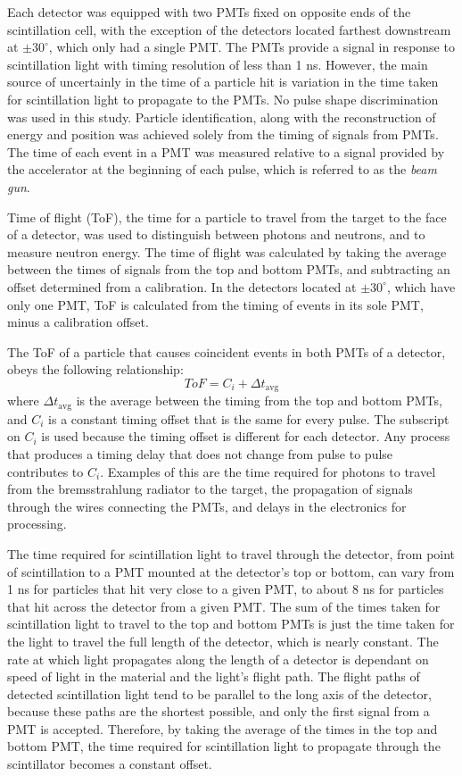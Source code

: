 Each detector was equipped with two PMTs fixed on opposite ends of the scintillation cell, with the exception of the detectors located farthest downstream at $\pm30^{\circ}$, which only had a single PMT. The PMTs provide a signal in response to scintillation light with timing resolution of less than 1 ns. However, the main source of uncertainly in the time of a particle hit is variation in the time taken for scintillation light to propagate to the PMTs. No pulse shape discrimination was used in this study. Particle identification, along with the reconstruction of energy and position was achieved solely from the timing of signals from PMTs. The time of each event in a PMT was measured relative to a signal provided by the accelerator at the beginning of each pulse, which is referred to as the \textit{beam gun}.  

Time of flight (ToF), the time for a particle to travel from the target to the face of a detector, was used to distinguish between photons and neutrons, and to measure neutron energy. The time of flight was calculated by taking the average between the times of signals from the top and bottom PMTs, and subtracting an offset determined from a calibration. In the detectors located at $\pm30^{\circ}$, which have only one PMT, ToF is calculated from the timing of events in its sole PMT, minus a calibration offset.

The ToF of a particle that causes coincident events in both PMTs of a detector, obeys the following relationship:
\begin{displaymath}
ToF = C_i + \Delta t_{\text{avg}} 
\end{displaymath}
where $\Delta t_{\text{avg}} $ is the average between the timing from the top and bottom PMTs, and $C_i$ is a constant timing offset that is the same for every pulse. The subscript on $C_i$ is used because the timing offset is different for each detector. Any process that produces a timing delay that does not change from pulse to pulse contributes to $C_{i}$. Examples of this are the time required for photons to travel from the bremsstrahlung radiator to the target, the propagation of signals through the wires connecting the PMTs, and delays in the electronics for processing. 

The time required for scintillation light to travel through the detector, from point of scintillation to a PMT mounted at the detector's top or bottom, can vary from 1 ns for particles that hit very close to a given PMT, to about 8 ns for particles that hit across the detector from a given PMT. The sum of the times taken for scintillation light to travel to the top and bottom PMTs is just the time taken for the light to travel the full length of the detector, which is nearly constant. The rate at which light propagates along the length of a detector is dependant on speed of light in the material and the light's flight path. The flight paths of detected scintillation light tend to be parallel to the long axis of the detector, because these paths are the shortest possible, and only the first signal from a PMT is accepted. Therefore, by taking the average of the times in the top and bottom PMT, the time required for scintillation light to propagate through the scintillator becomes a constant offset.


